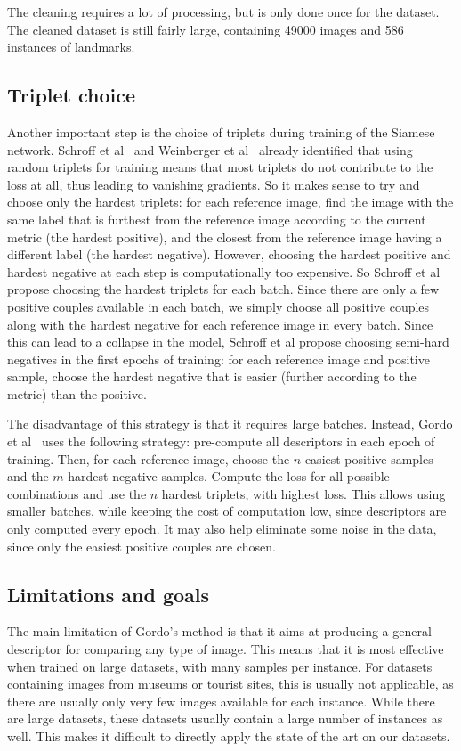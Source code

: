 The cleaning requires a lot of processing,
but is only done once for the dataset.
The cleaned dataset is still fairly large, containing 49000 images and
586 instances of landmarks.

\subsection{Triplet choice}
Another important step is the choice of triplets during training of
the Siamese network. Schroff et al~\cite{schroff_facenet:_2015}
and Weinberger et al~\cite{weinberger_distance_2006} already identified
that using random triplets for training means that most triplets do not
contribute to the loss at all, thus leading to vanishing gradients.
So it makes sense to try and choose only the hardest triplets: for each
reference image, find the image with the same label that is furthest from the
reference image according to the current metric (the hardest positive),
and the closest from the reference image having a different label
(the hardest negative).
However, choosing the hardest positive and hardest negative at each step
is computationally too expensive. So Schroff et al~\cite{schroff_facenet:_2015}
propose choosing the hardest triplets for each batch. Since there are only
a few positive couples available in each batch, we simply choose all
positive couples along with the hardest negative for each reference image
in every batch. Since this can lead to a collapse in the model, Schroff
et al propose choosing semi-hard negatives in the first epochs of
training: for each reference image and positive sample, choose the hardest
negative that is easier (further according to the metric) than the positive.

The disadvantage of this strategy is that it requires large batches.
Instead, Gordo et al~\cite{gordo_end--end_2016} uses the following
strategy: pre-compute all descriptors in each epoch of training.
Then, for each reference image, choose the $n$ easiest positive samples
and the $m$ hardest negative samples. Compute the loss for all possible
combinations and use the $n$ hardest triplets, with highest loss.
This allows using smaller batches, while keeping the cost of computation
low, since descriptors are only computed every epoch. It may also help
eliminate some noise in the data, since only the easiest positive couples
are chosen.

\subsection{Limitations and goals}\label{sec:limitations}
The main limitation of Gordo's method is that it aims at producing a
general descriptor for comparing any type of image. This means that it
is most effective when trained on large datasets, with many samples
per instance. For datasets containing images from museums or tourist
sites, this is usually not applicable, as there are usually only very few
images available for each instance. While there are large datasets,
these datasets usually contain a large number of instances as well.
This makes it difficult to directly apply the state of the art on
our datasets.


